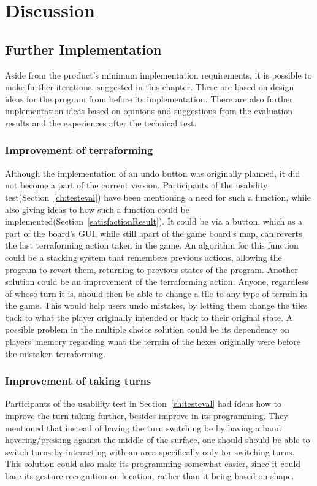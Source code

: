 \chapter{Discussion}\label{ch:discussion}


\section{Further Implementation}
Aside from the product's minimum implementation requirements, it is possible to make further iterations, suggested in this chapter. These are based on design ideas for the program from before its implementation. There are also further implementation ideas based on opinions and suggestions from the evaluation results and the experiences after the technical test.

\subsection{Improvement of terraforming}
Although the implementation of an undo button was originally planned, it did not become a part of the current version. Participants of the usability test(Section~\ref{ch:testeval}) have been mentioning a need for such a function, while also giving ideas to how such a function could be implemented(Section~\ref{satisfactionResult}). It could be via a button, which as a part of the board's GUI, while still apart of the game board's map, can reverts the last terraforming action taken in the game. An algorithm for this function could be a stacking system that remembers previous actions, allowing the program to revert them, returning to previous states of the program. Another solution could be an improvement of the terraforming action. Anyone, regardless of whose turn it is, should then be able to change a tile to any type of terrain in the game. This would help users undo mistakes, by letting them change the tiles back to what the player originally intended or back to their original state. A possible problem in the multiple choice solution could be its dependency on players' memory regarding what the terrain of the hexes originally were before the mistaken terraforming. 

\subsection{Improvement of taking turns}
Participants of the usability test in Section~\ref{ch:testeval} had ideas how to improve the turn taking further, besides improve in its programming. They mentioned that instead of having the turn switching be by having a hand hovering/pressing against the middle of the surface, one should should be able to switch turns by interacting with an area specifically only for switching turns. This solution could  also make its programming somewhat easier, since it could base its gesture recognition on location, rather than it being based on shape.

